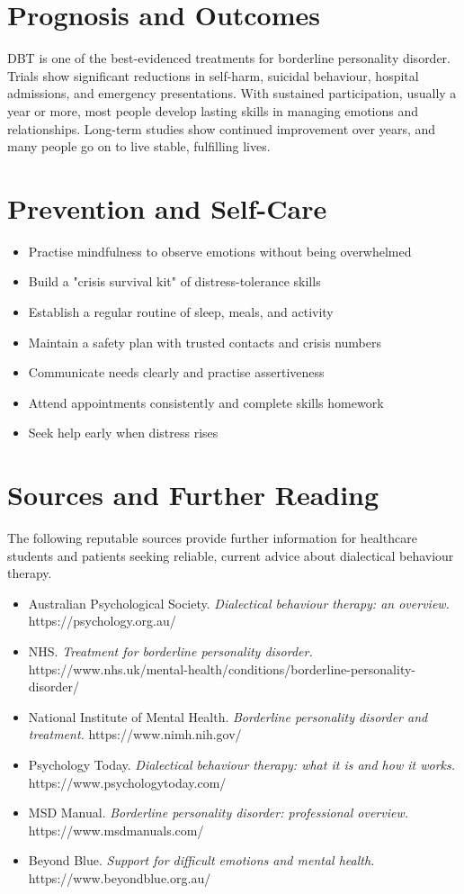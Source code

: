 \section*{Prognosis and Outcomes}
DBT is one of the best-evidenced treatments for borderline personality disorder. Trials show significant reductions in self-harm, suicidal behaviour, hospital admissions, and emergency presentations. With sustained participation, usually a year or more, most people develop lasting skills in managing emotions and relationships. Long-term studies show continued improvement over years, and many people go on to live stable, fulfilling lives.

\section*{Prevention and Self-Care}
\begin{itemize}
    \item Practise mindfulness to observe emotions without being overwhelmed
    \item Build a "crisis survival kit" of distress-tolerance skills
    \item Establish a regular routine of sleep, meals, and activity
    \item Maintain a safety plan with trusted contacts and crisis numbers
    \item Communicate needs clearly and practise assertiveness
    \item Attend appointments consistently and complete skills homework
    \item Seek help early when distress rises
\end{itemize}

\section*{Sources and Further Reading}
The following reputable sources provide further information for healthcare students and patients seeking reliable, current advice about dialectical behaviour therapy.

\begin{itemize}
    \item Australian Psychological Society. \textit{Dialectical behaviour therapy: an overview.} https://psychology.org.au/
    \item NHS. \textit{Treatment for borderline personality disorder.} https://www.nhs.uk/mental-health/conditions/borderline-personality-disorder/
    \item National Institute of Mental Health. \textit{Borderline personality disorder and treatment.} https://www.nimh.nih.gov/
    \item Psychology Today. \textit{Dialectical behaviour therapy: what it is and how it works.} https://www.psychologytoday.com/
    \item MSD Manual. \textit{Borderline personality disorder: professional overview.} https://www.msdmanuals.com/
    \item Beyond Blue. \textit{Support for difficult emotions and mental health.} https://www.beyondblue.org.au/
\end{itemize}

